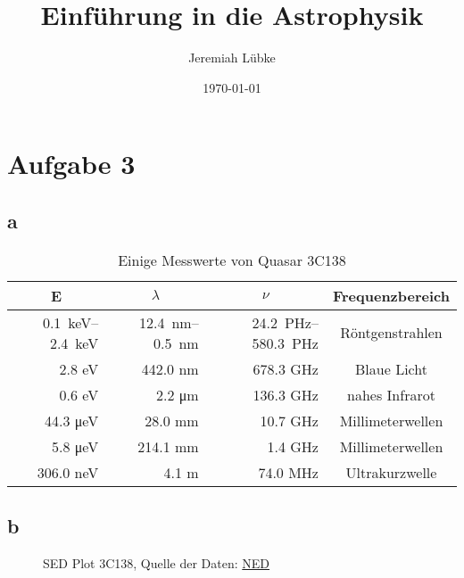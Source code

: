 \documentclass[11pt,a4paper]{scrartcl}
\title{Einführung in die Astrophysik}
\author{Jeremiah Lübke}
\date{\today}
\newcommand{\head}[1]{\multicolumn{1}{c}{#1}}
\begin{document}
\section*{Aufgabe 3}
\subsection*{a}

\begin{table}[h]
\centering
\begin{tabular}{rrrc}
    \toprule
    \head{E} & \head{$\lambda$} & \head{$\nu$} & \head{Frequenzbereich} \\
    \midrule
    \SIrange{0.1}{2.4}{\kilo\electronvolt} & \SIrange{12.4}{0.5}{\nano\metre} &
    \SIrange{24.2}{580.3}{\peta\hertz} & Röntgenstrahlen \\
    2.8 \si{\electronvolt} & 442.0 \si{\nano\metre} & 678.3 \si{\giga\hertz} &
    Blaue Licht \\
    0.6 \si{\electronvolt} & 2.2 \si{\micro\metre} & 136.3 \si{\giga\hertz} &
    nahes Infrarot \\
    44.3 \si{\micro\electronvolt} & 28.0 \si{\milli\metre} & 10.7 \si{\giga\hertz}
    &  Millimeterwellen \\
    5.8 \si{\micro\electronvolt} & 214.1 \si{\milli\metre} & 1.4 \si{\giga\hertz}
    & Millimeterwellen \\
    306.0 \si{\nano\electronvolt} & 4.1 \si{\metre} & 74.0 \si{\mega\hertz} &
    Ultrakurzwelle \\
    \bottomrule
\end{tabular}
\caption{Einige Messwerte von Quasar 3C138}
\label{tab:tab1}
\end{table}

\subsection*{b}
\begin{figure}[h]
    \centering
    \caption{SED Plot 3C138, Quelle der Daten:
        \href{https://ned.ipac.caltech.edu/}{NED}}
    \label{fig:fig1}
\end{figure}
\end{document}
